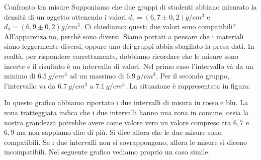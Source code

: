 \documentclass[12pt,a4paper,oneside]{book}
\makeatletter
\renewcommand{\section}{\@startsection{section}{1}{\z@}
{-4ex \@plus -1ex \@minus -.4ex}
{1ex \@plus.2ex }
{\normalfont\large\sffamily\bfseries}}
\theoremstyle{esercizio}
\makeatother
\begin{document}
\section{Confronto tra misure}
Supponiamo che due gruppi di studenti abbiano misurato la densità di un oggetto ottenendo i valori $d_1=\left(6,7 \pm 0,2\right)\si{g/cm^3}$ e $d_2=\left(6,9 \pm 0,2\right)\si{g/cm^3}$. Ci chiediamo: questi due valori sono compatibili? All'apparenza no, perchè sono diversi. Siamo portati a pensare che i materiali siano leggermente diversi, oppure uno dei gruppi abbia sbagliato la presa dati. In realtà, per rispondere correttamente, dobbiamo ricordare che le misure sono incerte e il risultato è un intervallo di valori. Nel primo caso l'intervallo và da un minimo di $\SI{6,5}{g/	cm^3}$ ad un massimo di $\SI{6,9}{g/cm^3}$. Per il secondo gruppo, l'intervallo va da $\SI{6,7}{g/cm^3}$ a $\SI{7,1}{g/cm^3}$. La situazione è rappresentata in figura:


In questo grafico abbiamo riportato i due intervalli di misura in rosso e blu. La zona tratteggiata indica che i due intervalli hanno una zona in comune, ossia la nostra grandezza potrebbe avere come valore vero un valore compreso tra $6,7$ e $6,9$ ma non sappiamo dire di più. Si dice allora che le due misure sono compatibili. Se i due intervalli non si sovrappongono, allora le misure si dicono incompatibili. Nel seguente grafico vediamo proprio un caso simile.
\end{document}
